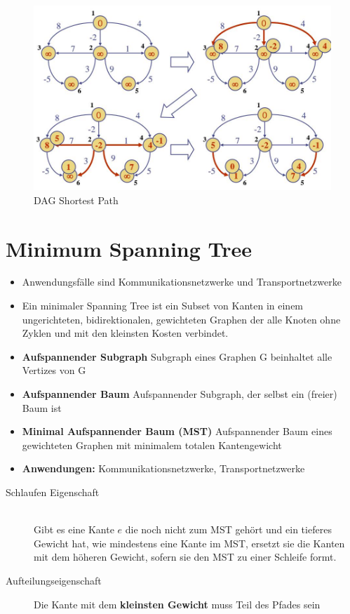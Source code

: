 \begin{figure}[h]
\centering
\includegraphics[width=0.6\linewidth]{images/dag_shortest_path}
\caption{DAG Shortest Path}
\label{fig:dagshortestpath}
\end{figure}


\section{Minimum Spanning Tree}
\begin{itemize}
	\item Anwendungsfälle sind Kommunikationsnetzwerke und Transportnetzwerke
	\item Ein minimaler Spanning Tree ist ein Subset von Kanten in einem ungerichteten, bidirektionalen, gewichteten Graphen der alle Knoten ohne Zyklen und mit den kleinsten Kosten verbindet.
	\item \textbf{Aufspannender Subgraph} Subgraph eines Graphen G beinhaltet alle Vertizes von G
	\item \textbf{Aufspannender Baum} Aufspannender Subgraph, der selbst ein (freier) Baum ist
	\item \textbf{Minimal Aufspannender Baum (MST)} Aufspannender Baum eines gewichteten Graphen mit minimalem totalen Kantengewicht
	\item \textbf{Anwendungen:} Kommunikationsnetzwerke, Transportnetzwerke
\end{itemize}

\begin{description}
	\item[Schlaufen Eigenschaft] \hfill \\
	Gibt es eine Kante $e$ die noch nicht zum MST gehört und ein tieferes Gewicht hat, wie mindestens eine Kante im MST, ersetzt sie die Kanten mit dem höheren Gewicht, sofern sie den MST zu einer Schleife formt.
	\item[Aufteilungseigenschaft] Die Kante mit dem \textbf{kleinsten Gewicht} muss Teil des Pfades sein
\end{description}
\clearpage

